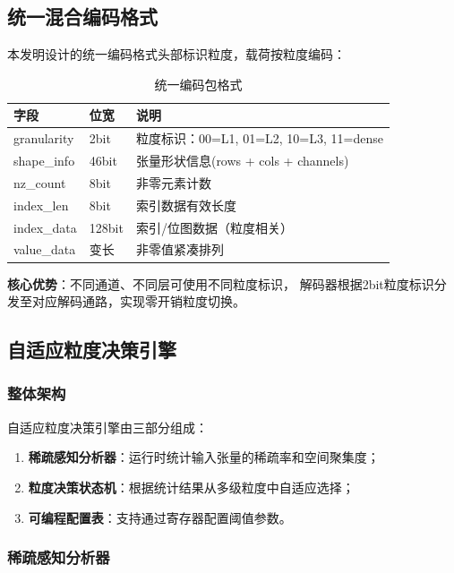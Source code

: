 \documentclass[a4paper,12pt,fontset=ubuntu]{ctexart}
\begin{document}
\subsection{统一混合编码格式}

本发明设计的统一编码格式头部标识粒度，载荷按粒度编码：

\begin{table}[htbp]
\centering
\caption{统一编码包格式}
\begin{tabular}{lll}
\toprule
\textbf{字段} & \textbf{位宽} & \textbf{说明} \\
\midrule
granularity   & 2bit   & 粒度标识：00=L1, 01=L2, 10=L3, 11=dense \\
shape\_info   & 46bit  & 张量形状信息(rows + cols + channels) \\
nz\_count     & 8bit   & 非零元素计数 \\
index\_len    & 8bit   & 索引数据有效长度 \\
index\_data   & 128bit & 索引/位图数据（粒度相关） \\
value\_data   & 变长   & 非零值紧凑排列 \\
\bottomrule
\end{tabular}
\end{table}

\textbf{核心优势}：不同通道、不同层可使用不同粒度标识，
解码器根据2bit粒度标识分发至对应解码通路，实现零开销粒度切换。

\subsection{自适应粒度决策引擎}

\subsubsection{整体架构}

自适应粒度决策引擎由三部分组成：

\begin{enumerate}
  \item \textbf{稀疏感知分析器}：运行时统计输入张量的稀疏率和空间聚集度；
  \item \textbf{粒度决策状态机}：根据统计结果从多级粒度中自适应选择；
  \item \textbf{可编程配置表}：支持通过寄存器配置阈值参数。
\end{enumerate}

\subsubsection{稀疏感知分析器}
\end{document}
